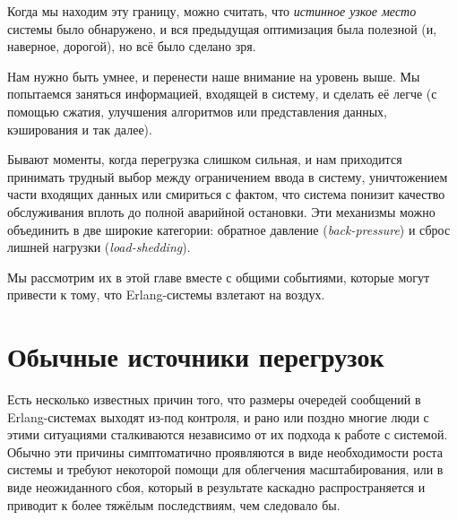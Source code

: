 Когда мы находим эту границу, можно считать, что \emph{истинное узкое место} системы было обнаружено, и вся предыдущая оптимизация была полезной (и, наверное, дорогой), но всё было сделано зря.

Нам нужно быть умнее, и перенести наше внимание на уровень выше. Мы попытаемся заняться информацией, входящей в систему, и сделать её легче (с помощью сжатия, улучшения алгоритмов или представления данных, кэширования и так далее).

Бывают моменты, когда перегрузка слишком сильная, и нам приходится принимать трудный выбор между ограничением ввода в систему, уничтожением части входящих данных или смириться с фактом, что система понизит качество обслуживания вплоть до полной аварийной остановки. Эти механизмы можно объединить в две широкие категории: обратное давление (\emph{back-pressure}) и сброс лишней нагрузки (\emph{load-shedding}).

Мы рассмотрим их в этой главе вместе с общими событиями, которые могут привести к тому, что Erlang-системы взлетают на воздух.


\section{Обычные источники перегрузок}

Есть несколько известных причин того, что размеры очередей сообщений в Erlang-системах выходят из-под контроля, и рано или поздно многие люди с этими ситуациями сталкиваются независимо от их подхода к работе с системой. Обычно эти причины симптоматично проявляются в виде необходимости роста системы и требуют некоторой помощи для облегчения масштабирования, или в виде неожиданного сбоя, который в результате каскадно распространяется и приводит к более тяжёлым последствиям, чем следовало бы.

